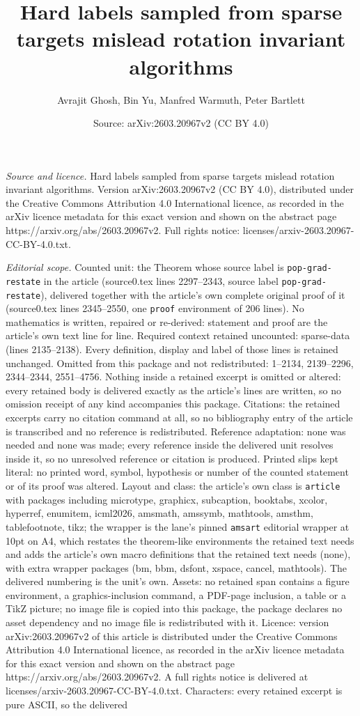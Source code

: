 \documentclass[10pt,a4paper]{amsart}
\title[Hard labels sampled from sparse targets mislead rotation inv]{Hard labels sampled from sparse targets mislead rotation invariant algorithms}
\author{Avrajit Ghosh, Bin Yu, Manfred Warmuth, Peter Bartlett}
\date{Source: arXiv:2603.20967v2 (CC BY 4.0)}
\begin{document}
\maketitle

\noindent\emph{Source and licence.} Hard labels sampled from sparse targets mislead rotation invariant algorithms. Version arXiv:2603.20967v2 (CC BY 4.0), distributed under the Creative Commons Attribution 4.0 International licence, as recorded in the arXiv licence metadata for this exact version and shown on the abstract page https://arxiv.org/abs/2603.20967v2. Full rights notice: licenses/arxiv-2603.20967-CC-BY-4.0.txt.\par\smallskip

\noindent\textit{Editorial scope.} Counted unit: the Theorem whose source label is \texttt{pop-grad-restate} in the article (source0.tex lines 2297--2343, source label \texttt{pop-grad-restate}), delivered together with the article's own complete original proof of it (source0.tex lines 2345--2550, one \texttt{proof} environment of 206 lines). No mathematics is written, repaired or re-derived: statement and proof are the article's own text line for line. Required context retained uncounted: sparse-data (lines 2135--2138). Every definition, display and label of those lines is retained unchanged. Omitted from this package and not redistributed: 1--2134, 2139--2296, 2344--2344, 2551--4756. Nothing inside a retained excerpt is omitted or altered: every retained body is delivered exactly as the article's lines are written, so no omission receipt of any kind accompanies this package. Citations: the retained excerpts carry no citation command at all, so no bibliography entry of the article is transcribed and no reference is redistributed. Reference adaptation: none was needed and none was made; every reference inside the delivered unit resolves inside it, so no unresolved reference or citation is produced. Printed slips kept literal: no printed word, symbol, hypothesis or number of the counted statement or of its proof was altered. Layout and class: the article's own class is \texttt{article} with packages including microtype, graphicx, subcaption, booktabs, xcolor, hyperref, enumitem, icml2026, amsmath, amssymb, mathtools, amsthm, tablefootnote, tikz; the wrapper is the lane's pinned \texttt{amsart} editorial wrapper at 10pt on A4, which restates the theorem-like environments the retained text needs and adds the article's own macro definitions that the retained text needs (none), with extra wrapper packages (bm, bbm, dsfont, xspace, cancel, mathtools). The delivered numbering is the unit's own. Assets: no retained span contains a figure environment, a graphics-inclusion command, a PDF-page inclusion, a table or a TikZ picture; no image file is copied into this package, the package declares no asset dependency and no image file is redistributed with it. Licence: version arXiv:2603.20967v2 of this article is distributed under the Creative Commons Attribution 4.0 International licence, as recorded in the arXiv licence metadata for this exact version and shown on the abstract page https://arxiv.org/abs/2603.20967v2. A full rights notice is delivered at licenses/arxiv-2603.20967-CC-BY-4.0.txt. Characters: every retained excerpt is pure ASCII, so the delivered 
\end{document}
